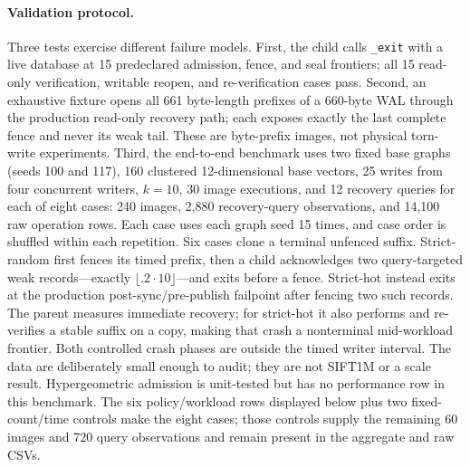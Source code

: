 \documentclass[sigconf,nonacm,balance=false]{acmart}
\begin{document}
\paragraph{Validation protocol.} Three tests exercise different failure models.
First, the child calls \texttt{\_exit} with a live database at 15 predeclared
admission, fence, and seal frontiers; all 15 read-only verification, writable
reopen, and re-verification cases pass. Second, an exhaustive fixture opens all
661 byte-length prefixes of a
660-byte WAL through the production read-only recovery path; each exposes exactly
the last complete fence and never its weak tail. These are byte-prefix images, not
physical torn-write experiments. Third, the end-to-end benchmark uses two fixed
base graphs (seeds 100 and 117), 160 clustered 12-dimensional base vectors, 25
writes from four concurrent writers, $k=10$, 30 image executions, and 12 recovery
queries for each of eight cases: 240 images, 2{,}880 recovery-query observations,
and 14{,}100 raw operation rows. Each case uses each graph seed 15 times, and case
order is shuffled within each repetition. Six cases clone a terminal unfenced
suffix. Strict-random first fences its timed prefix, then a child acknowledges
two query-targeted weak records---exactly $\lfloor .2\cdot10\rfloor$---and exits
before a fence. Strict-hot instead exits at the production
post-sync/pre-publish failpoint after fencing two such records. The parent
measures immediate recovery; for strict-hot it also performs and re-verifies a
stable suffix on a copy, making that crash a nonterminal mid-workload frontier.
Both controlled crash phases are outside the timed writer interval. The data are deliberately
small enough to audit; they are not SIFT1M or a scale result. Hypergeometric
admission is unit-tested but has no performance row in this benchmark.
The six policy/workload rows displayed below plus two fixed-count/time controls
make the eight cases; those controls supply the remaining 60 images and 720 query
observations and remain present in the aggregate and raw CSVs.
\end{document}
